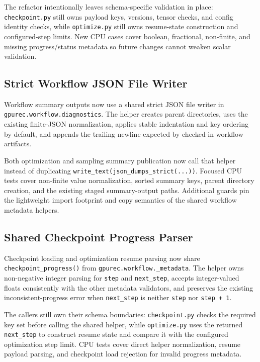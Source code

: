 \documentclass[11pt]{article}
\begin{document}
The refactor intentionally leaves schema-specific validation in place:
\texttt{checkpoint.py} still owns payload keys, versions, tensor checks, and
config identity checks, while \texttt{optimize.py} still owns resume-state
construction and configured-step limits.  New CPU cases cover boolean,
fractional, non-finite, and missing progress/status metadata so future changes
cannot weaken scalar validation.

\subsection{Strict Workflow JSON File Writer}

Workflow summary outputs now use a shared strict JSON file writer in
\texttt{gpurec.workflow.diagnostics}.  The helper creates parent directories,
uses the existing finite-JSON normalization, applies stable indentation and key
ordering by default, and appends the trailing newline expected by checked-in
workflow artifacts.

Both optimization and sampling summary publication now call that helper instead
of duplicating \texttt{write\_text(json\_dumps\_strict(...))}.  Focused CPU
tests cover non-finite value normalization, sorted summary keys, parent
directory creation, and the existing staged summary-output paths.  Additional
guards pin the lightweight import footprint and copy semantics of the shared
workflow metadata helpers.

\subsection{Shared Checkpoint Progress Parser}

Checkpoint loading and optimization resume parsing now share
\texttt{checkpoint\_progress()} from \texttt{gpurec.workflow.\_metadata}.  The
helper owns non-negative integer parsing for \texttt{step} and
\texttt{next\_step}, accepts integer-valued floats consistently with the other
metadata validators, and preserves the existing inconsistent-progress error
when \texttt{next\_step} is neither \texttt{step} nor \texttt{step + 1}.

The callers still own their schema boundaries: \texttt{checkpoint.py} checks the
required key set before calling the shared helper, while \texttt{optimize.py}
uses the returned \texttt{next\_step} to construct resume state and compare it
with the configured optimization step limit.  CPU tests cover direct helper
normalization, resume payload parsing, and checkpoint load rejection for invalid
progress metadata.
\end{document}
